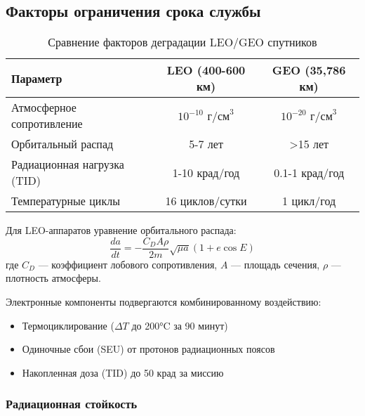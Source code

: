 \subsection{Факторы ограничения срока службы}

\begin{table}[htbp]
	\centering
	\caption{Сравнение факторов деградации LEO/GEO спутников}
	\begin{tabular}{|l|c|c|}
		\hline
		Параметр                    & LEO (400-600 км)           & GEO (35,786 км)            \\
		\hline
		Атмосферное сопротивление   & $10^{-10}$ $\text{г/см}^3$ & $10^{-20}$ $\text{г/см}^3$ \\
		Орбитальный распад          & 5-7 лет                    & >15 лет                    \\
		Радиационная нагрузка (TID) & 1-10 крад/год              & 0.1-1 крад/год             \\
		Температурные циклы         & 16 циклов/сутки            & 1 цикл/год                 \\
		\hline
	\end{tabular}
\end{table}

Для LEO-аппаратов уравнение орбитального распада:
\begin{equation}
	\frac{da}{dt} = -\frac{C_D A \rho}{2m} \sqrt{\mu a}(1 + e\cos E)
\end{equation}
где $C_D$  — коэффициент лобового сопротивления, $A$ — площадь сечения, $\rho$ — плотность атмосферы.

Электронные компоненты подвергаются комбинированному воздействию:
\begin{itemize}
	\item Термоциклирование ($\Delta T$ до 200°C за 90 минут)
	\item Одиночные сбои (SEU) от протонов радиационных поясов
	\item Накопленная доза (TID) до 50 крад за миссию
\end{itemize}

\subsubsection{Радиационная стойкость}

